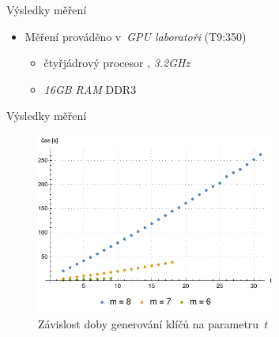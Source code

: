\documentclass{beamer}
\begin{document}
\begin{frame}{Výsledky měření}

    \begin{itemize}
        \item Měření prováděno v~\emph{GPU laboratoři} (T9:350)
            \begin{itemize}
                \item čtyřjádrový procesor , \emph{3.2\;GHz}
                \item \emph{16\;GB RAM} DDR3
            \end{itemize}
    \end{itemize}

\end{frame}

\begin{frame}{Výsledky měření}

    \begin{figure}[!ht]
        \centering
        \includegraphics[width=0.7\textwidth]{../../implementace/grafy/listplot_m6-8_generovani.pdf}
        \caption[Časová složitost generování klíčů]{
            Závislost doby generování klíčů na parametru~$t$
        }
        \label{obr_mereni_t_gen}
    \end{figure}

\end{frame}
\end{document}
